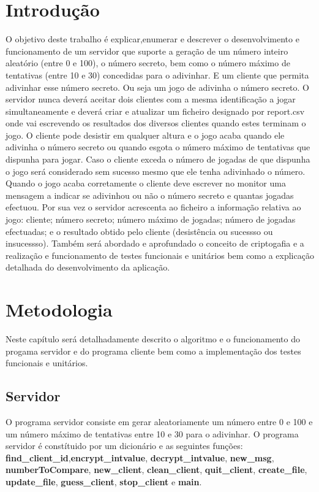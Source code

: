 \documentclass{report}
\begin{document}
\tableofcontents
 \listoffigures    %


\clearpage
{}

\chapter{Introdução}
\label{chap.introducao}
O objetivo deste trabalho é explicar,enumerar e descrever o desenvolvimento e funcionamento de um servidor que suporte a geração de um número inteiro aleatório (entre 0 e 100), o número secreto, bem como o número máximo de tentativas (entre 10 e 30) concedidas para o adivinhar. E um cliente que permita adivinhar esse número secreto. Ou seja um jogo de adivinha o número secreto.
O servidor nunca deverá aceitar dois clientes com a mesma identificação a jogar simultaneamente e deverá criar e atualizar um ficheiro designado por report.csv onde vai escrevendo os resultados dos diversos clientes quando estes terminam o jogo. O cliente pode desistir em qualquer altura e o jogo acaba quando ele adivinha o número secreto ou quando esgota o número máximo de tentativas que dispunha para jogar. Caso o cliente exceda o número de jogadas de que dispunha o jogo será considerado sem sucesso mesmo que ele tenha adivinhado o número. Quando o jogo acaba corretamente o cliente deve escrever no monitor uma mensagem a indicar se adivinhou ou não o número secreto e quantas jogadas efectuou. Por sua vez o servidor acrescenta ao ficheiro a informação relativa ao jogo: cliente; número secreto; número máximo de jogadas; número de jogadas efectuadas; e o resultado obtido pelo cliente (desistência ou sucessso ou insucessso).
Também será abordado e aprofundado o conceito de criptogafia e a realização e funcionamento de testes funcionais e unitários bem como a explicação detalhada do desenvolvimento da aplicação.


\chapter{Metodologia}
\label{chap.metodologia}
Neste capítulo será detalhadamente descrito o algoritmo e o funcionamento do progama servidor e do programa cliente bem como a implementação dos testes funcionais e unitários.
\section{Servidor}
O programa servidor consiste em gerar aleatoriamente um número entre 0 e 100 e um número máximo de tentativas entre 10 e 30 para o adivinhar. 
	O programa servidor é constítuido por um dicionário e as seguintes funções: \textbf{find\_client\_id},\textbf{encrypt\_intvalue}, \textbf{decrypt\_intvalue}, \textbf{new\_msg}, \textbf{numberToCompare}, \textbf{new\_client}, \textbf{clean\_client}, \textbf{quit\_client}, \textbf{create\_file}, \textbf{update\_file}, \textbf{guess\_client}, \textbf{stop\_client} e \textbf{main}.
\end{document}
